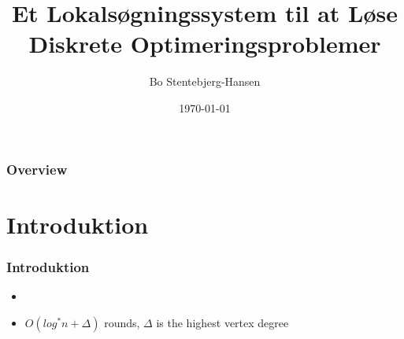 \documentclass{beamer}
\title[]{Et Lokalsøgningssystem til at Løse Diskrete 
Optimeringsproblemer}%
\author{Bo Stentebjerg-Hansen} %
\institute[IMADA] %
{
Syddansk Universitet \\ %
\medskip
Institut for Matematik og Datalogi
}
\date{\today} %
\begin{document}
\begin{frame}
\titlepage %
\end{frame}

\begin{frame}
\frametitle{Overview} %
\tableofcontents %
\end{frame}


\section{Introduktion} %

\begin{frame}
\frametitle{Introduktion}
\begin{itemize}[<+->]
\item 
\item 
$O(log^* n + \Delta)$ rounds, $\Delta$ is the highest vertex degree 
\end{itemize}




\end{frame}
\end{document}
